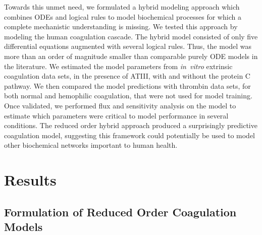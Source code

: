 \documentclass[processes,article,received,moreauthors,pdftex,12pt,a4paper]{mdpi}
\begin{document}
Towards this unmet need, we formulated a hybrid modeling approach which combines ODEs and logical rules to model 
biochemical processes for which a complete mechanistic understanding is missing. 
We tested this approach by modeling the human coagulation cascade. 
The hybrid model consisted of only five differential equations augmented with several logical rules.
Thus, the model was more than an order of magnitude smaller than comparable purely ODE models in the literature.
We estimated the model parameters from \textit{in~vitro} extrinsic coagulation data sets, in the presence of ATIII, with and without the protein C pathway. 
We then compared the model predictions with thrombin data sets, for both normal and hemophilic coagulation, that were not used for model training.
Once validated, we performed flux and sensitivity analysis on the model to estimate which parameters were critical to model performance in several conditions. 
The reduced order hybrid approach produced a surprisingly predictive coagulation model, 
suggesting this framework could potentially be used to model other biochemical networks important to human health. 



\section{Results}


\subsection{Formulation of Reduced Order Coagulation Models}
\end{document}

